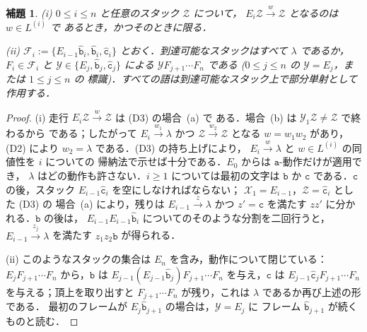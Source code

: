 \documentclass[11pt,a4paper]{ltjsarticle}
\numberwithin{equation}{section}
\theoremstyle{plain}
\newtheorem{lemma}[theorem]{補題}
\theoremstyle{definition}
\theoremstyle{remark}
\theoremstyle{plain}
\newcommand{\eps}{\lambda}
\begin{document}
\begin{lemma}\label{lem:app-br-recognition}
\label{lem:app-tl-reachable}
\textup{(i)} $0\le i\le n$ と任意のスタック $\mathcal Z$ について，
$E_i\mathcal Z\xrightarrow{w}\mathcal Z$ となるのは $w\in L^{(i)}$ で
あるとき，かつそのときに限る．

\textup{(ii)} $\mathcal F_i:=\{E_{i-1}\hat{\mathtt b}_i,\hat{\mathtt b}_i,\hat{\mathtt c}_i\}$
とおく．到達可能なスタックはすべて $\eps$ であるか，$F_i\in\mathcal F_i$
と $\mathcal Y\in\{E_j,\hat{\mathtt b}_j,\hat{\mathtt c}_j\}$ による
$\mathcal YF_{j+1}\cdots F_n$ である
\textup($0\le j\le n$ の $\mathcal Y=E_j$，または $1\le j\le n$ の
標識\textup)．すべての語は到達可能なスタック上で部分単射として作用する．
\end{lemma}

\begin{proof}
(i) 走行 $E_i\mathcal Z\xrightarrow{w}\mathcal Z$ は (D3) の場合~(a) で
ある．場合~(b) は $\mathcal Y_1\mathcal Z\ne\mathcal Z$ で終わるから
である；したがって $E_i\xrightarrow{w_1}\eps$ かつ
$\mathcal Z\xrightarrow{w_2}\mathcal Z$ となる $w=w_1w_2$ があり，(D2)
により $w_2=\eps$ である．(D3) の持ち上げにより，
$E_i\xrightarrow{w}\eps$ と $w\in L^{(i)}$ の同値性を $i$ についての
帰納法で示せば十分である．$E_0$ からは $\mathtt a$-動作だけが適用でき，
$\eps$ はどの動作も許さない．$i\ge1$ については最初の文字は $\mathtt b$
か $\mathtt c$ である．$\mathtt c$ の後，スタック
$E_{i-1}\hat{\mathtt c}_i$ を空にしなければならない；
$\mathcal X_1=E_{i-1}$，$\mathcal Z=\hat{\mathtt c}_i$ とした (D3) の
場合~(a) により，残りは $E_{i-1}\xrightarrow{z}\eps$ かつ $z'=\mathtt c$
を満たす $zz'$ に分かれる．$\mathtt b$ の後は，
$E_{i-1}E_{i-1}\hat{\mathtt b}_i$ についてのそのような分割を二回行うと，
$E_{i-1}\xrightarrow{z_j}\eps$ を満たす $z_1z_2\mathtt b$ が得られる．

(ii) このようなスタックの集合は $E_n$ を含み，動作について閉じている：
$E_jF_{j+1}\cdots F_n$ から，$\mathtt b$ は
$E_{j-1}(E_{j-1}\hat{\mathtt b}_j)F_{j+1}\cdots F_n$ を与え，$\mathtt c$
は $E_{j-1}\hat{\mathtt c}_jF_{j+1}\cdots F_n$ を与える；頂上を取り出すと
$F_{j+1}\cdots F_n$ が残り，これは $\eps$ であるか再び上述の形である．
最初のフレームが $E_j\hat{\mathtt b}_{j+1}$ の場合は，$\mathcal Y=E_j$ に
フレーム $\hat{\mathtt b}_{j+1}$ が続くものと読む．


\end{proof}
\end{document}
